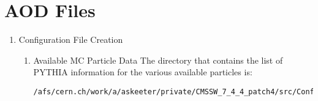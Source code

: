 \documentclass[11 pt , letterpaper , twoside , openright]{book}
\begin{document}
\section{AOD Files}
\label{sec-1-1-2}
\begin{enumerate}
\item Configuration File Creation
\label{sec-1-1-2-1}

\begin{enumerate}
\item Available MC Particle Data
\label{sec-1-1-2-1-1}
The directory that contains the list of PYTHIA information for the
various available particles is:
\lstset{language=sh,label= ,caption= ,numbers=none}
\begin{lstlisting}
/afs/cern.ch/work/a/askeeter/private/CMSSW_7_4_4_patch4/src/Configuration/GenProduction/python/ThirteenTeV/
\end{lstlisting}


\end{enumerate}
\end{enumerate}
\end{document}
